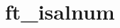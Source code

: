 \chapter{ft\+\_\+isalnum}
\hypertarget{md_Documentation_2ft__isalnum}{}\label{md_Documentation_2ft__isalnum}
